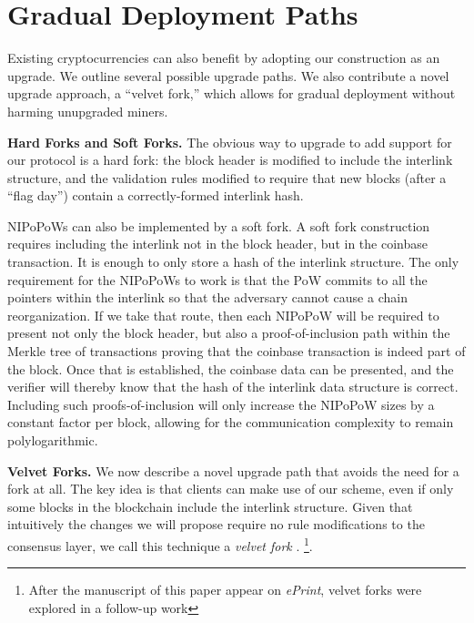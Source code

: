\section{Gradual Deployment Paths}\label{sec:forks}

Existing cryptocurrencies can also benefit by adopting our construction as an
upgrade. We outline several possible upgrade paths. We also contribute a novel
upgrade approach, a ``velvet fork,'' which allows for gradual deployment without
harming unupgraded miners.

\noindent
\textbf{Hard Forks and Soft Forks.}
The obvious way to upgrade to add support for our protocol is a hard fork:
the block header is modified to include the interlink structure, and the
validation rules modified to require that new blocks (after a ``flag day'')
contain a correctly-formed interlink hash.

NIPoPoWs can also be implemented by a soft fork. A soft fork construction
requires including the interlink not in the block header, but in the coinbase
transaction. It is enough to only store a hash of the interlink structure. The
only requirement for the NIPoPoWs to work is that the PoW commits to all the
pointers within the interlink so that the adversary cannot cause a chain
reorganization. If we take that route, then each NIPoPoW will be required to
present not only the block header, but also a proof-of-inclusion path within the
Merkle tree of transactions proving that the coinbase transaction is indeed part
of the block. Once that is established, the coinbase data can be presented, and
the verifier will thereby know that the hash of the interlink data structure is
correct. Including such proofs-of-inclusion will only increase the NIPoPoW sizes
by a constant factor per block, allowing for the communication complexity to
remain polylogarithmic.

\noindent
\textbf{Velvet Forks.}
We now describe a novel upgrade path that avoids the need for a fork at all. The
key idea is that clients can make use of our scheme, even if only some blocks in
the blockchain include the interlink structure. Given that intuitively the
changes we will propose require no rule modifications to the consensus layer, we call this
technique a \emph{velvet fork}
\ifanonymous
  .
\else
  \footnote{After the manuscript of this paper appear on
  \emph{ePrint}, velvet forks were explored in a follow-up
  work\cite{velvet}}.
\fi

